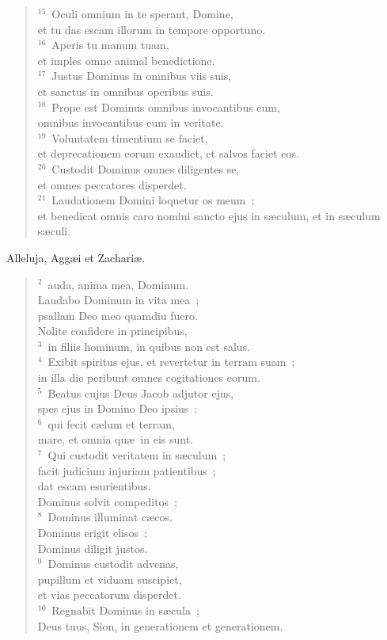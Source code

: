 \begin{verse}
${}^{15}$~Oculi omnium in te sperant, Domine,\\ et tu das escam illorum in tempore opportuno.\\
${}^{16}$~Aperis tu manum tuam,\\ et imples omne animal benedictione.\\
${}^{17}$~Justus Dominus in omnibus viis suis,\\ et sanctus in omnibus operibus suis.\\
${}^{18}$~Prope est Dominus omnibus invocantibus eum,\\ omnibus invocantibus eum in veritate.\\
${}^{19}$~Voluntatem timentium se faciet,\\ et deprecationem eorum exaudiet, et salvos faciet eos.\\
${}^{20}$~Custodit Dominus omnes diligentes se,\\ et omnes peccatores disperdet.\\
${}^{21}$~Laudationem Domini loquetur os meum~;\\ et benedicat omnis caro nomini sancto ejus in s\ae culum, et in s\ae culum s\ae culi.\end{verse}



\bchapter[Psalm]
Alleluja, Agg\ae i et Zachari\ae .
\begin{verse}${}^{2}$~auda, anima mea, Dominum.\\ Laudabo Dominum in vita mea~;\\ psallam Deo meo quamdiu fuero.\\ Nolite confidere in principibus,\\
${}^{3}$~in filiis hominum, in quibus non est salus.\\
${}^{4}$~Exibit spiritus ejus, et revertetur in terram suam~;\\ in illa die peribunt omnes cogitationes eorum.\\
${}^{5}$~Beatus cujus Deus Jacob adjutor ejus,\\ spes ejus in Domino Deo ipsius~:\\
${}^{6}$~qui fecit c\ae lum et terram,\\ mare, et omnia qu\ae\ in eis sunt.\\
${}^{7}$~Qui custodit veritatem in s\ae culum~;\\ facit judicium injuriam patientibus~;\\ dat escam esurientibus.\\ Dominus solvit compeditos~;\\
${}^{8}$~Dominus illuminat c\ae cos.\\ Dominus erigit elisos~;\\ Dominus diligit justos.\\
${}^{9}$~Dominus custodit advenas,\\ pupillum et viduam suscipiet,\\ et vias peccatorum disperdet.\\
${}^{10}$~Regnabit Dominus in s\ae cula~;\\ Deus tuus, Sion, in generationem et generationem.\end{verse}




